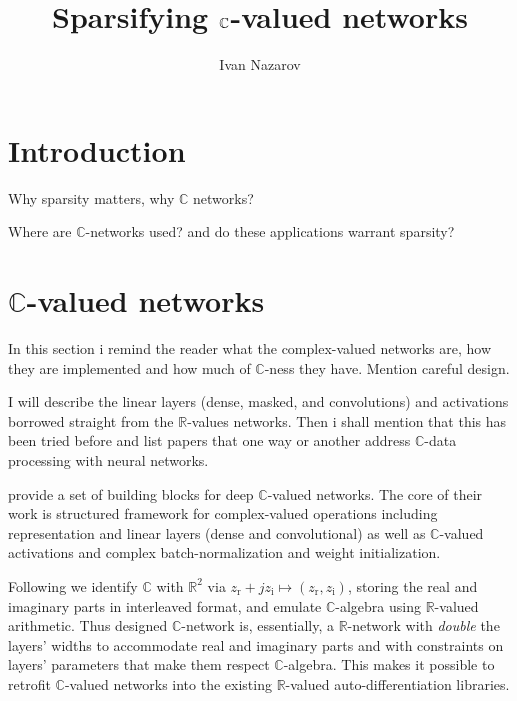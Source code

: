 \documentclass[a4paper,10pt]{article}
\title{Sparsifying $\cplx$-valued networks}
\author{Ivan Nazarov}
\newcommand{\real}{\mathbb{R}}
\newcommand{\cplx}{\mathbb{C}}
\begin{document}
\maketitle


\section{Introduction} %
\label{sec:introduction}

Why sparsity matters, why $\cplx$ networks?

Where are $\cplx$-networks used? and do these applications warrant sparsity?


\section{$\cplx$-valued networks} %
\label{sec:c_valued_networks}

In this section i remind the reader what the complex-valued networks are, how
they are implemented and how much of $\cplx$-ness they have. Mention careful
design.

I will describe the linear layers (dense, masked, and convolutions) and
activations borrowed straight from the $\real$-values networks. Then i shall
mention that this has been tried before and list papers that one way or another
address $\cplx$-data processing with neural networks.

\cite{trabelsi_deep_2017} provide a set of building blocks for deep $\cplx$-valued
networks. The core of their work is structured framework for complex-valued operations
including representation and linear layers (dense and convolutional) as well
as $\cplx$-valued activations and complex batch-normalization and weight initialization.

Following \cite{trabelsi_deep_2017} we identify $\cplx$ with $\real^2$ via $
  z_\mathrm{r} + j z_\mathrm{i} \mapsto (z_\mathrm{r}, z_\mathrm{i})
$, storing the real and imaginary parts in interleaved format, and emulate $\cplx$-algebra
using $\real$-valued arithmetic. Thus designed $\cplx$-network is, essentially, a
$\real$-network with \textit{double} the layers' widths to accommodate real and imaginary
parts and with constraints on layers' parameters that make them respect $\cplx$-algebra.
This makes it possible to retrofit $\cplx$-valued networks into the existing $\real$-valued
auto-differentiation libraries.
\end{document}
